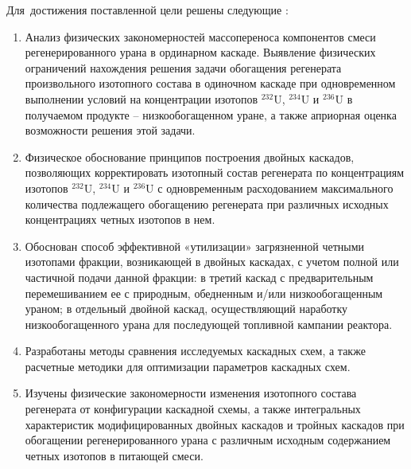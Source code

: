 Для~достижения поставленной цели решены следующие {\tasks}:
\begin{enumerate}
  \item Анализ физических закономерностей массопереноса компонентов смеси
  регенерированного урана в ординарном каскаде.
  Выявление физических ограничений нахождения решения задачи обогащения регенерата произвольного изотопного
  состава в одиночном каскаде при одновременном выполнении условий на
  концентрации изотопов $^{232}$U, $^{234}$U и $^{236}$U в получаемом продукте – низкообогащенном уране, а также априорная оценка возможности решения этой задачи.
  \item Физическое обоснование принципов построения двойных каскадов,
  позволяющих корректировать изотопный состав регенерата по концентрациям
  изотопов $^{232}$U, $^{234}$U и $^{236}$U с одновременным расходованием максимального количества
  подлежащего обогащению регенерата при различных исходных концентрациях
  четных изотопов в нем.
  \item Обоснован способ эффективной «утилизации» загрязненной четными
  изотопами фракции, возникающей в двойных каскадах, с учетом полной или
  частичной подачи данной фракции: в третий каскад с предварительным
  перемешиванием ее с природным, обедненным и/или низкообогащенным ураном; в отдельный двойной каскад, осуществляющий наработку низкообогащенного урана для последующей топливной кампании реактора.
  \item Разработаны методы сравнения исследуемых каскадных схем, а также расчетные методики для оптимизации параметров каскадных схем.
  \item Изучены физические закономерности изменения изотопного состава регенерата
  от конфигурации каскадной схемы,
  а также
  интегральных характеристик модифицированных двойных каскадов и тройных
  каскадов при обогащении регенерированного урана с различным исходным
  содержанием четных изотопов в питающей смеси.
\end{enumerate}


